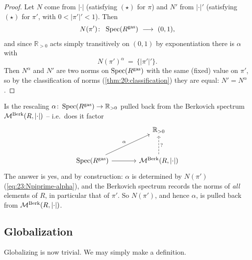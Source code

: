 \begin{proof}
Let $N$ come from $\lvert\cdot\rvert$ (satisfying $(\star)$ for $\pi$) and $N'$
from $\lvert\cdot\rvert'$ (satisfying $(\star)$ for $\pi'$, with
$0<\lvert\pi'\rvert'<1$). Then
\begin{equation}
\label{eq:23:Npiprime}
N(\pi')\colon\ \operatorname{Spec}(R^\gasx)\ \longrightarrow\ (0,1),
\end{equation}
and since $\mathbb R_{>0}$ acts simply transitively on $(0,1)$ by exponentiation
there is $\alpha$ with
\begin{equation}
\label{eq:23:Npiprime-alpha}
N(\pi')^{\alpha}\ =\ \{\lvert\pi'\rvert'\}.
\end{equation}
Then $N^{\alpha}$ and $N'$ are two norms on $\operatorname{Spec}(R^{\mathrm{gas}})$ with
the same (fixed) value on $\pi'$, so by the classification of norms
(\cref{thm:20:classification}) they are equal: $N'=N^\alpha$.
\end{proof}

\begin{remark}
\label{rmk:23:ofer}
Is the rescaling $\alpha\colon\operatorname{Spec}(R^{\mathrm{gas}})\to\mathbb R_{>0}$
pulled back from the Berkovich spectrum $\mathcal{M}^{\mathrm{Berk}}(R,\lvert\cdot\rvert)$ -- i.e.\
does it factor
\begin{equation*}
\begin{tikzcd}[column sep=large, row sep=large]
& \mathbb R_{>0} \\
\operatorname{Spec}(R^\gasx) \arrow[ur, "\alpha"] \arrow[r] &
\MBerk(R,\lvert\cdot\rvert) \arrow[u, dashed, "?"']
\end{tikzcd}
\end{equation*}
The answer is yes, and by construction: $\alpha$ is determined by $N(\pi')$
(\eqref{eq:23:Npiprime-alpha}), and the Berkovich spectrum records the norms of
\emph{all} elements of $R$, in particular that of $\pi'$. So $N(\pi')$, and hence
$\alpha$, is pulled back from $\mathcal{M}^{\mathrm{Berk}}(R,\lvert\cdot\rvert)$.
\end{remark}

\subsection{Globalization}
\label{subsec:23:globalization}

Globalizing is now trivial. We may simply make a definition.


